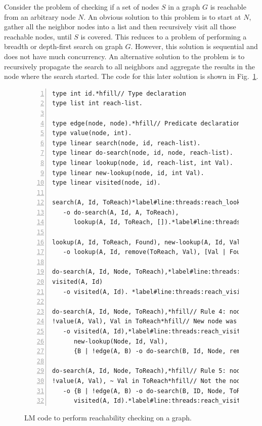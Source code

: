 Consider the problem of checking if a set of nodes $S$ in a graph $G$ is
reachable from an arbitrary node $N$. An obvious solution to this problem is to
start at $N$, gather all the neighbor nodes into a list and then recursively
visit all those reachable nodes, until $S$ is covered. This reduces to a problem
of performing a breadth or depth-first search on graph $G$. However, this
solution is sequential and does not have much concurrency.  An alternative
solution to the problem is to recursively propagate the search to all neighbors
and aggregate the results in the node where the search started.  The code for
this later solution is shown in Fig.~\ref{code:threads:reach_simple}.

\begin{figure}[h]
\begin{Verbatim}[numbers=left,fontsize=\codesize,commandchars=*\#\&]
type int id.*hfill// Type declaration
type list int reach-list.

type edge(node, node).*hfill// Predicate declaration
type value(node, int).
type linear search(node, id, reach-list).
type linear do-search(node, id, node, reach-list).
type linear lookup(node, id, reach-list, int Val).
type linear new-lookup(node, id, int Val).
type linear visited(node, id).

search(A, Id, ToReach)*label#line:threads:reach_lookup1&*hfill// Rule 1: initialize search
   -o do-search(A, Id, A, ToReach),
      lookup(A, Id, ToReach, []).*label#line:threads:reach_lookup2&

lookup(A, Id, ToReach, Found), new-lookup(A, Id, Val)*hfill// Rule 2: new reachable node found
   -o lookup(A, Id, remove(ToReach, Val), [Val | Found]).

do-search(A, Id, Node, ToReach),*label#line:threads:reach_visit1&*hfill// Rule 3: node has already seen this search
visited(A, Id)
   -o visited(A, Id). *label#line:threads:reach_visit2&

do-search(A, Id, Node, ToReach),*hfill// Rule 4: node found and propagate search
!value(A, Val), Val in ToReach*hfill// New node was found.
   -o visited(A, Id),*label#line:threads:reach_visit_visited1&
      new-lookup(Node, Id, Val),
      {B | !edge(A, B) -o do-search(B, Id, Node, remove(ToReach, Val))}.*label#line:threads:reach_propagate&

do-search(A, Id, Node, ToReach),*hfill// Rule 5: node not found and propagate search
!value(A, Val), ~ Val in ToReach*hfill// Not the node we are looking for.
   -o {B | !edge(A, B) -o do-search(B, ID, Node, ToReach)},*label#line:threads:reach_propagate2&
      visited(A, Id).*label#line:threads:reach_visit_visited2&
\end{Verbatim}

\caption{LM code to perform reachability checking on a graph.}
\label{code:threads:reach_simple}
\end{figure}

